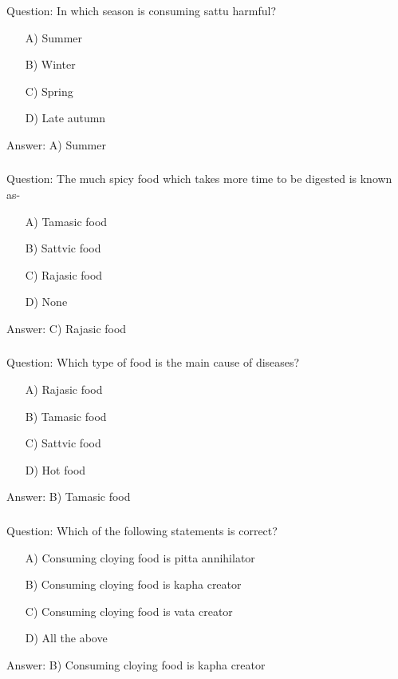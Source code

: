 \begin{frame}[fragile]\frametitle{}

Question: In which season is consuming sattu harmful?

\begin{itemize}
\item[A)] Summer
\item[B)] Winter
\item[C)] Spring
\item[D)] Late autumn
\end{itemize}

Answer: A) Summer
\end{frame}

\begin{frame}[fragile]\frametitle{}

Question: The much spicy food which takes more time to be digested is known as-

\begin{itemize}
\item[A)] Tamasic food
\item[B)] Sattvic food
\item[C)] Rajasic food
\item[D)] None
\end{itemize}

Answer: C) Rajasic food
\end{frame}

\begin{frame}[fragile]\frametitle{}

Question: Which type of food is the main cause of diseases?

\begin{itemize}
\item[A)] Rajasic food
\item[B)] Tamasic food
\item[C)] Sattvic food
\item[D)] Hot food
\end{itemize}

Answer: B) Tamasic food
\end{frame}

\begin{frame}[fragile]\frametitle{}

Question: Which of the following statements is correct?

\begin{itemize}
\item[A)] Consuming cloying food is pitta annihilator
\item[B)] Consuming cloying food is kapha creator
\item[C)] Consuming cloying food is vata creator
\item[D)] All the above
\end{itemize}

Answer: B) Consuming cloying food is kapha creator
\end{frame}

